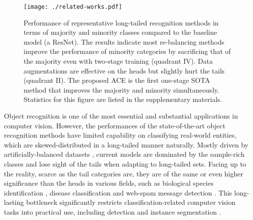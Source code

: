 \begin{figure}[!t]
\begin{center}
\texttt{[image: ./related-works.pdf]}
\end{center}
   \caption{Performance of representative long-tailed recognition methods in terms of majority and minority classes compared to the baseline model (a ResNet). The results indicate most re-balancing methods improve the performance of minority categories by sacrificing that of the majority even with two-stage training (quadrant IV). Data augmentations are effective on the heads but slightly hurt the tails (quadrant II). The proposed ACE is the first one-stage SOTA method that improves the majority and minority simultaneously. Statistics for this figure are listed in the supplementary materials.}
\label{fig:related_works}
\end{figure}

Object recognition is one of the most essential and substantial applications in computer vision. However, the performances of the state-of-the-art object recognition methods have limited capability on classifying real-world entities, which are skewed-distributed in a long-tailed manner naturally. Mostly driven by artificially-balanced datasets \cite{ deng2009imagenet,krizhevsky2009learning}, current models are dominated by the sample-rich classes and lose sight of the tails when adapting to long-tailed sets. Facing up to the reality, scarce as the tail categories are, they are of the same or even higher significance than the heads in various fields, such as biological species identification \cite{van2018inaturalist}, disease classification \cite{wang2020imbalance} and web-spam message detection \cite{zhao2020heterogeneous}. This long-lasting bottleneck significantly restricts classification-related computer vision tasks into practical use, including detection \cite{tan2020equalization, wu2020forest, yu2021towards} and instance segmentation \cite{wang2020devil, zang2021fasa}.

